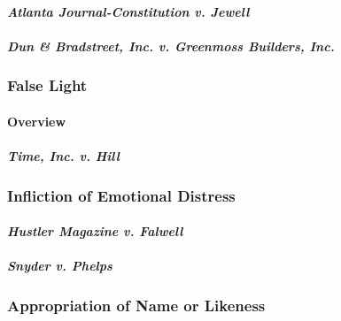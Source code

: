 
\paragraph{\emph{Atlanta Journal-Constitution v. Jewell}}


\paragraph{\emph{Dun \& Bradstreet, Inc. v. Greenmoss Builders, Inc.}}


\subsubsection{False Light}

\paragraph{Overview}


\paragraph{\emph{Time, Inc. v. Hill}}


\subsubsection{Infliction of Emotional Distress}

\paragraph{\emph{Hustler Magazine v. Falwell}}


\paragraph{\emph{Snyder v. Phelps}}


\subsubsection{Appropriation of Name or Likeness}

